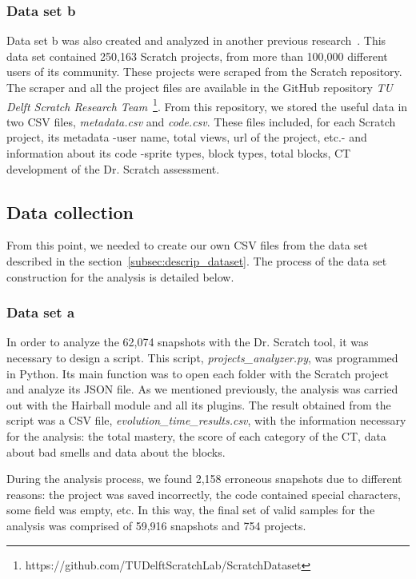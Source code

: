 \subsubsection{Data set b}
\label{subsubsec:dataser_b}

Data set b was also created and analyzed in another previous research~\cite{aivaloglou2017dataset}. This data set contained 250,163 Scratch projects, from more than 100,000 different users of its community. These projects were scraped from the Scratch repository. The scraper and all the project files are available in the GitHub repository \textit{TU Delft Scratch Research Team}~\footnote{https://github.com/TUDelftScratchLab/ScratchDataset}. From this repository, we stored the useful data in two CSV files, \textit{metadata.csv} and \textit{code.csv}. These files included, for each Scratch project, its metadata -user name, total views, url of the project, etc.- and information about its code -sprite types, block types, total blocks, CT development of the Dr. Scratch assessment. 


\subsection{Data collection}
\label{subsec:datacollection}

From this point, we needed to create our own CSV files from the data set described in the section~\ref{subsec:descrip_dataset}. The process of the data set construction for the analysis is detailed below.

\subsubsection{Data set a}
\label{subsubsec:datacollection_a}

In order to analyze the 62,074 snapshots with the Dr. Scratch tool, it was necessary to design a script. This script, \textit{projects\_analyzer.py}, was programmed in Python. Its main function was to open each folder with the Scratch project and analyze its JSON file. As we mentioned previously, the analysis was carried out with the Hairball module and all its plugins. The result obtained from the script was a CSV file, \textit{evolution\_time\_results.csv}, with the information necessary for the analysis: the total mastery, the score of each category of the CT, data about bad smells and data about the blocks.

During the analysis process, we found 2,158 erroneous snapshots due to different reasons: the project was saved incorrectly, the code contained special characters, some field was empty, etc. In this way, the final set of valid samples for the analysis was comprised of 59,916 snapshots and 754 projects.

